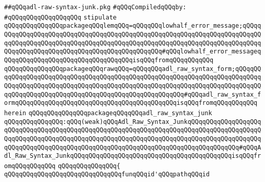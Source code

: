 \label{src/lib/compiler/back/low/tools/adl-syntax/adl-raw-syntax-junk.pkg}
\verb|##qQQqadl-raw-syntax-junk.pkg|\newline
\newline
\verb|#qQQqCompiledqQQqby:|\newline
\verb|#qQQqqQQqqQQqqQQqqQQq|\newline
\newline
\verb|stipulate|\newline
\verb|qQQqqQQqqQQqqQQqpackageqQQqlemqQQq=qQQqqQQqlowhalf_error_message;qQQqqQQqqQQqqQQqqQQqqQQqqQQqqQQqqQQqqQQqqQQqqQQqqQQqqQQqqQQqqQQqqQQqqQQqqQQqqQQqqQQqqQQqqQQqqQQqqQQqqQQqqQQqqQQqqQQqqQQqqQQqqQQqqQQqqQQqqQQqqQQqqQQqqQQqqQQqqQQqqQQqqQQqqQQqqQQqqQQqqQQqqQQq#qQQqlowhalf_error_messageqQQqqQQqqQQqqQQqqQQqqQQqqQQqqQQqqQQqisqQQqfromqQQqqQQqqQQq|\newline
\verb|qQQqqQQqqQQqqQQqpackageqQQqrawqQQq=qQQqqQQqadl_raw_syntax_form;qQQqqQQqqQQqqQQqqQQqqQQqqQQqqQQqqQQqqQQqqQQqqQQqqQQqqQQqqQQqqQQqqQQqqQQqqQQqqQQqqQQqqQQqqQQqqQQqqQQqqQQqqQQqqQQqqQQqqQQqqQQqqQQqqQQqqQQqqQQqqQQqqQQqqQQqqQQqqQQqqQQqqQQqqQQqqQQqqQQqqQQqqQQqqQQqqQQq#qQQqadl_raw_syntax_formqQQqqQQqqQQqqQQqqQQqqQQqqQQqqQQqqQQqqQQqqQQqisqQQqfromqQQqqQQqqQQq|\newline
\verb|herein|\newline
\newline
\verb|qQQqqQQqqQQqqQQqpackageqQQqqQQqadl_raw_syntax_junk|\newline
\verb|qQQqqQQqqQQqqQQq:qQQq(weak)qQQqAdl_Raw_Syntax_JunkqQQqqQQqqQQqqQQqqQQqqQQqqQQqqQQqqQQqqQQqqQQqqQQqqQQqqQQqqQQqqQQqqQQqqQQqqQQqqQQqqQQqqQQqqQQqqQQqqQQqqQQqqQQqqQQqqQQqqQQqqQQqqQQqqQQqqQQqqQQqqQQqqQQqqQQqqQQqqQQqqQQqqQQqqQQqqQQqqQQqqQQqqQQqqQQqqQQqqQQqqQQqqQQqqQQqqQQqqQQqqQQq#qQQqAdl_Raw_Syntax_JunkqQQqqQQqqQQqqQQqqQQqqQQqqQQqqQQqqQQqqQQqqQQqisqQQqfromqQQqqQQqqQQq|\newline
\verb|qQQqqQQqqQQqqQQq{|\newline
\verb|qQQqqQQqqQQqqQQqqQQqqQQqqQQqqQQqfunqQQqid'qQQqpathqQQqid|\newline
